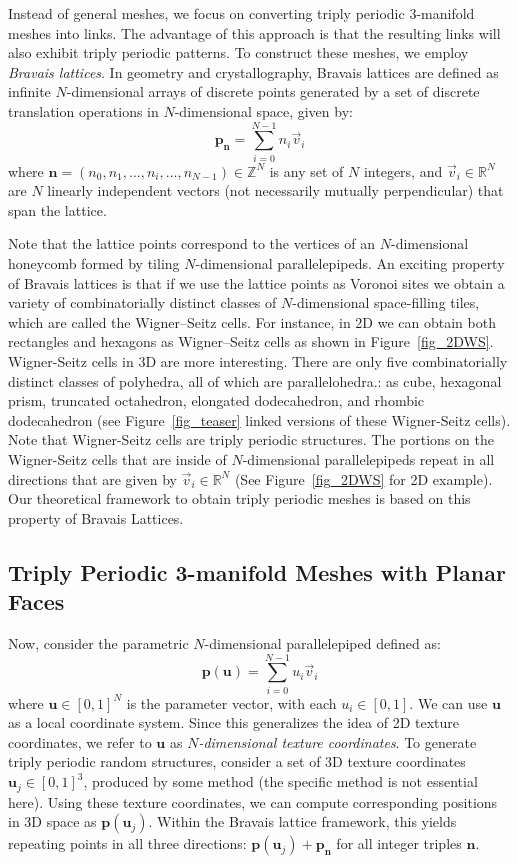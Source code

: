 \documentclass[times,twocolumn,final]{elsarticle}
\newcommand{\ergun}[1]{{\color{red} #1}}
\begin{document}
Instead of general meshes, we focus on converting triply periodic 3-manifold meshes into links. The advantage of this approach is that the resulting links will also exhibit triply periodic patterns. To construct these meshes, we employ \textit{Bravais lattices}. In geometry and crystallography, Bravais lattices are defined as infinite $N$-dimensional arrays of discrete points generated by a set of discrete translation operations in $N$-dimensional space, given by:
\[
\mathbf{p}_{\mathbf{n}} = \sum_{i=0}^{N-1} n_i \vec{v}_i
\]
where $\mathbf{n} = (n_0, n_1, \dots, n_i, \dots, n_{N-1}) \in \mathbb{Z}^N$ is any set of $N$ integers, and $\vec{v}_i \in \mathbb{R}^N$ are $N$ linearly independent vectors (not necessarily mutually perpendicular) that span the lattice. 

Note that the lattice points correspond to the vertices of an $N$-dimensional honeycomb formed by tiling $N$-dimensional parallelepipeds. An exciting property of Bravais lattices is that if we use the lattice points as Voronoi sites we obtain a variety of combinatorially distinct classes of $N$-dimensional space-filling tiles, which are called the Wigner–Seitz cells. For instance, in 2D we can obtain both rectangles and hexagons as Wigner–Seitz cells as shown in Figure~\ref{fig_2DWS}. Wigner-Seitz cells in 3D are more interesting. \ergun{There are only five combinatorially distinct classes of polyhedra, all of which are parallelohedra.}: as cube, hexagonal prism, truncated octahedron, elongated dodecahedron, and rhombic dodecahedron (see Figure~\ref{fig_teaser} linked versions of these Wigner-Seitz cells). 		
Note that Wigner-Seitz cells are triply periodic structures. The portions on the Wigner-Seitz cells that are inside of $N$-dimensional parallelepipeds repeat in all directions that are given by  $\vec{v}_i \in \mathbb{R}^N$ (See  Figure~\ref{fig_2DWS} for 2D example). Our theoretical framework to obtain triply periodic meshes is based on this property of Bravais Lattices. 



\subsection{Triply Periodic 3-manifold Meshes with Planar Faces}
\label{sec_TP3MMwPF}

Now, consider the parametric $N$-dimensional parallelepiped defined as:
\[
\mathbf{p}(\mathbf{u}) = \sum_{i=0}^{N-1} u_i \vec{v}_i
\]
where $\mathbf{u} \in [0,1]^N$ is the parameter vector, with each $u_i \in [0,1]$. We can use $\mathbf{u}$ as a local coordinate system. Since this generalizes the idea of 2D texture coordinates, we refer to $\mathbf{u}$ as \textit{$N$-dimensional texture coordinates}.
To generate triply periodic random structures, consider a set of 3D texture coordinates $\mathbf{u}_j \in [0,1]^3$, produced by some method (the specific method is not essential here). Using these texture coordinates, we can compute corresponding positions in 3D space as $\mathbf{p}(\mathbf{u}_j)$. Within the Bravais lattice framework, this yields repeating points in all three directions: $
\mathbf{p}(\mathbf{u}_j) + \mathbf{p}_{\mathbf{n}}
$
for all integer triples $\mathbf{n}$.
\end{document}
